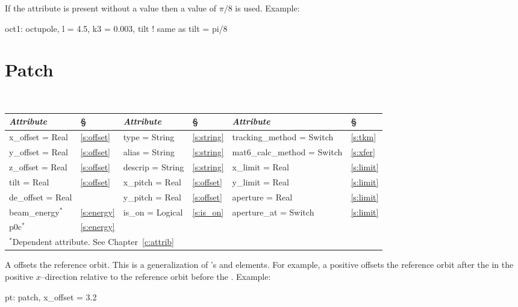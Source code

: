 {{
If the  attribute is present without a value then a value of 
$\pi/8$ is used.
Example:
\begin{example}
  oct1: octupole, l = 4.5, k3 = 0.003, tilt ! same as tilt = pi/8
\end{example}

\section{Patch}
\label{s:patch}

\begin{center}
\tt
\begin{tabular}{|l|l||l|l||l|l|} \hline
  {\sl Attribute} & \S  & {\sl Attribute} & \S & {\sl Attribute} & \S \\ \hline
  x\_offset  = Real  & \ref{s:offset} &  type = String      & \ref{s:string} & tracking\_method = Switch   & \ref{s:tkm}   \\ \hline
  y\_offset  = Real  & \ref{s:offset} &  alias = String     & \ref{s:string} & mat6\_calc\_method = Switch & \ref{s:xfer}  \\ \hline
  z\_offset  = Real  & \ref{s:offset} &  descrip = String   & \ref{s:string} & x\_limit = Real             & \ref{s:limit} \\ \hline
  tilt = Real        & \ref{s:offset} &  x\_pitch   = Real  & \ref{s:offset} & y\_limit = Real             & \ref{s:limit} \\ \hline
  de\_offset = Real  &                &  y\_pitch   = Real  & \ref{s:offset} & aperture = Real             & \ref{s:limit} \\ \hline
  beam\_energy$^*$   & \ref{s:energy} &  is\_on = Logical   & \ref{s:is_on}  & aperture\_at = Switch       & \ref{s:limit} \\ \hline
  p0c$^*$            & \ref{s:energy} &                     &                &                             &               \\ \hline
  \multicolumn{6}{l}{\small $^*$Dependent attribute. See Chapter~\ref{c:attrib}} \\
\end{tabular}
\end{center}
\toffset

A  offsets the reference orbit. This is a generalization of
\mad's  and  elements. For example, a positive
 offsets the reference orbit after the  in the
positive $x$--direction relative to the reference orbit before the
.
Example:
\begin{example}
  pt: patch, x\_offset = 3.2
\end{example}

}}
